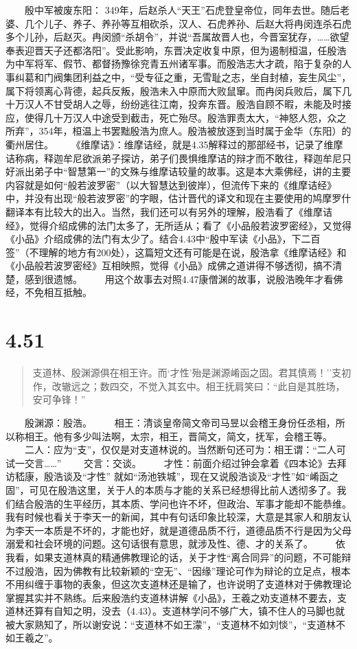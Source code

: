 \documentclass[]{book}
\begin{document}
　　殷中军被废东阳：
349年，后赵杀人``天王''石虎登皇帝位，同年去世。随后老婆、几个儿子、养子、养孙等互相砍杀，汉人、石虎养孙、后赵大将冉闵连杀石虎多个儿孙，后赵灭。冉闵颁``杀胡令''，并说``吾属故晋人也，今晋室犹存，\ldots{}\ldots{}欲望奉表迎晋天子还都洛阳''。受此影响，东晋决定收复中原，但为遏制桓温，任殷浩为中军将军、假节、都督扬豫徐兖青五州诸军事。而殷浩志大才疏，陷于复杂的人事纠葛和门阀集团利益之中，``受专征之重，无雪耻之志，坐自封植，妄生风尘''，属下将领离心背德，起兵反叛，殷浩未入中原而大败鼠窜。而冉闵兵败后，属下几十万汉人不甘受胡人之辱，纷纷逃往江南，投奔东晋。殷浩自顾不暇，未能及时接应，使得几十万汉人中途受到截击，死亡殆尽。殷浩罪责太大，``神怒人怨，众之所弃''，354年，桓温上书罢黜殷浩为庶人。殷浩被放逐到当时属于金华（东阳）的衢州居住。
　　《维摩诘》：维摩诘经，就是4.35解释过的那部经书，记录了维摩诘称病，释迦牟尼欲派弟子探访，弟子们畏惧维摩诘的辩才而不敢往，释迦牟尼只好派出弟子中``智慧第一''的文殊与维摩诘较量的故事。这是本大乘佛经，讲的主要内容就是如何``般若波罗密''（以大智慧达到彼岸），但流传下来的《维摩诘经》中，并没有出现``般若波罗密''的字眼，估计晋代的译文和现在主要使用的鸠摩罗什翻译本有比较大的出入。当然，我们还可以有另外的理解，殷浩看了《维摩诘经》，觉得介绍成佛的法门太多了，无所适从；看了《小品般若波罗密经》，又觉得《小品》介绍成佛的法门有太少了。结合4.43中``殷中军读《小品》，下二百签''（不理解的地方有200处），这篇短文还有可能是在说，殷浩拿《维摩诘经》和《小品般若波罗密经》互相映照，觉得《小品》成佛之道讲得不够透彻，搞不清楚，感到很遗憾。
　　用这个故事去对照4.47康僧渊的故事，说殷浩晚年才看佛经，不免相互抵触。

\section{4.51}\label{section-229}

\begin{quote}
支道林、殷渊源俱在相王许。而`才性'殆是渊源崤函之固。君其慎焉！''支初作，改辙远之；数四交，不觉入其玄中。相王抚肩笑曰：``此自是其胜场，安可争锋！''
\end{quote}

　　殷渊源：殷浩。
　　相王：清谈皇帝简文帝司马昱以会稽王身份任丞相，所以称相王。他有多少叫法啊，太宗，相王，晋简文，简文，抚军，会稽王等。
　　二人：应为``支''，仅仅是对支道林说的。当然断句还可为：相王谓：``二人可试一交言\ldots{}\ldots{}''
　　交言：交谈。
　　才性：前面介绍过钟会拿着《四本论》去拜访嵇康，殷浩谈及``才性''
就如``汤池铁城''，现在又说殷浩谈及``才性''如``崤函之固''，可见在殷浩这里，关于人的本质与才能的关系已经想得比前人透彻多了。我们结合殷浩的生平经历，其本质、学问也许不坏，但政治、军事才能却不能恭维。我有时候也看关于李天一的新闻，其中有句话印象比较深，大意是其家人和朋友认为李天一本质是不坏的，才能也好，就是道德品质不行，道德品质不行是因为父母溺爱和社会环境的问题。这句话很有意思，就涉及性、德、才的关系了。
　　依我看，如果支道林真的精通佛教理论的话，关于才性``离合同异''的问题，不可能辩不过殷浩，因为佛教有比较新颖的``空无''、``因缘''理论可作为辩论的立足点，根本不用纠缠于事物的表象，但这次支道林还是输了，也许说明了支道林对于佛教理论掌握其实并不熟练。后来殷浩约支道林讲解《小品》，王羲之劝支道林不要去，支道林还算有自知之明，没去（4.43）。支道林学问不够广大，镇不住人的马脚也就被大家熟知了，所以谢安说：``支道林不如王濛''，``支道林不如刘惔''，``支道林不如王羲之''。
\end{document}
